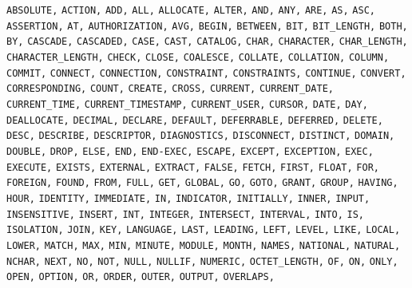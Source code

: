 \documentclass[11pt,a4paper]{ivoa}
\begin{document}
\noindent
\texttt{ABSOLUTE,} \texttt{ACTION,} \texttt{ADD,} \texttt{ALL,}
\texttt{ALLOCATE,} \texttt{ALTER,} \texttt{AND,} \texttt{ANY,}
\texttt{ARE,} \texttt{AS,} \texttt{ASC,} \texttt{ASSERTION,}
\texttt{AT,} \texttt{AUTHORIZATION,} \texttt{AVG,} \texttt{BEGIN,}
\texttt{BETWEEN,} \texttt{BIT,} \texttt{BIT\_LENGTH,} \texttt{BOTH,}
\texttt{BY,} \texttt{CASCADE,} \texttt{CASCADED,} \texttt{CASE,}
\texttt{CAST,} \texttt{CATALOG,} \texttt{CHAR,} \texttt{CHARACTER,}
\texttt{CHAR\_LENGTH,} \texttt{CHARACTER\_LENGTH,} \texttt{CHECK,}
\texttt{CLOSE,} \texttt{COALESCE,} \texttt{COLLATE,}
\texttt{COLLATION,} \texttt{COLUMN,} \texttt{COMMIT,}
\texttt{CONNECT,} \texttt{CONNECTION,} \texttt{CONSTRAINT,}
\texttt{CONSTRAINTS,} \texttt{CONTINUE,} \texttt{CONVERT,}
\texttt{CORRESPONDING,} \texttt{COUNT,} \texttt{CREATE,}
\texttt{CROSS,} \texttt{CURRENT,} \texttt{CURRENT\_DATE,}
\texttt{CURRENT\_TIME,} \texttt{CURRENT\_TIMESTAMP,}
\texttt{CURRENT\_USER,} \texttt{CURSOR,} \texttt{DATE,} \texttt{DAY,}
\texttt{DEALLOCATE,} \texttt{DECIMAL,} \texttt{DECLARE,}
\texttt{DEFAULT,} \texttt{DEFERRABLE,} \texttt{DEFERRED,}
\texttt{DELETE,} \texttt{DESC,} \texttt{DESCRIBE,}
\texttt{DESCRIPTOR,} \texttt{DIAGNOSTICS,} \texttt{DISCONNECT,}
\texttt{DISTINCT,} \texttt{DOMAIN,} \texttt{DOUBLE,} \texttt{DROP,}
\texttt{ELSE,} \texttt{END,} \texttt{END-EXEC,} \texttt{ESCAPE,}
\texttt{EXCEPT,} \texttt{EXCEPTION,} \texttt{EXEC,} \texttt{EXECUTE,}
\texttt{EXISTS,} \texttt{EXTERNAL,} \texttt{EXTRACT,} \texttt{FALSE,}
\texttt{FETCH,} \texttt{FIRST,} \texttt{FLOAT,} \texttt{FOR,}
\texttt{FOREIGN,} \texttt{FOUND,} \texttt{FROM,} \texttt{FULL,}
\texttt{GET,} \texttt{GLOBAL,} \texttt{GO,} \texttt{GOTO,}
\texttt{GRANT,} \texttt{GROUP,} \texttt{HAVING,} \texttt{HOUR,}
\texttt{IDENTITY,} \texttt{IMMEDIATE,} \texttt{IN,}
\texttt{INDICATOR,} \texttt{INITIALLY,} \texttt{INNER,}
\texttt{INPUT,} \texttt{INSENSITIVE,} \texttt{INSERT,} \texttt{INT,}
\texttt{INTEGER,} \texttt{INTERSECT,} \texttt{INTERVAL,}
\texttt{INTO,} \texttt{IS,} \texttt{ISOLATION,} \texttt{JOIN,}
\texttt{KEY,} \texttt{LANGUAGE,} \texttt{LAST,} \texttt{LEADING,}
\texttt{LEFT,} \texttt{LEVEL,} \texttt{LIKE,} \texttt{LOCAL,} \texttt{LOWER,}
\texttt{MATCH,} \texttt{MAX,} \texttt{MIN,}
\texttt{MINUTE,} \texttt{MODULE,} \texttt{MONTH,} \texttt{NAMES,}
\texttt{NATIONAL,} \texttt{NATURAL,} \texttt{NCHAR,} \texttt{NEXT,}
\texttt{NO,} \texttt{NOT,} \texttt{NULL,} \texttt{NULLIF,}
\texttt{NUMERIC,} \texttt{OCTET\_LENGTH,} \texttt{OF,} \texttt{ON,}
\texttt{ONLY,} \texttt{OPEN,} \texttt{OPTION,} \texttt{OR,}
\texttt{ORDER,} \texttt{OUTER,} \texttt{OUTPUT,} \texttt{OVERLAPS,}
\end{document}
